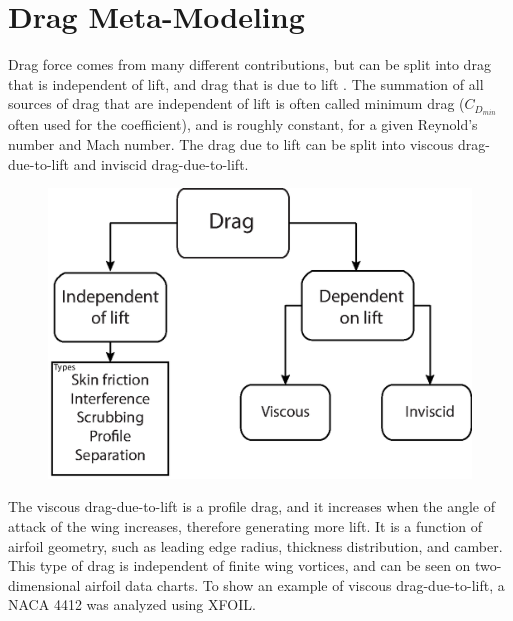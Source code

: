 \chapter{Drag Meta-Modeling}
Drag force comes from many different contributions, but can be split into drag that is independent of lift, and drag that is due to lift \cite{nicolaiWhitePaper}. The summation of all sources of drag that are  independent of lift is often called minimum drag ($C_{D_{min}}$ often used for the coefficient)\cite{raymer}, and is roughly constant, for a given Reynold's number and Mach number. The drag due to lift can be split into viscous drag-due-to-lift and inviscid drag-due-to-lift.
\begin{figure}[h!]
  \centering
  \includegraphics[width=.6\linewidth]{figures/dragDefinition.eps}
  \label{dragDefFig}
\end{figure}

 The viscous drag-due-to-lift is a profile drag, and it increases when the angle of attack of the wing increases, therefore generating more lift. It is a function of airfoil geometry, such as leading edge radius, thickness distribution, and camber. This type of drag is independent of finite wing vortices, and can be seen on two-dimensional airfoil data charts. To show an example of viscous drag-due-to-lift, a NACA 4412 was analyzed using XFOIL\cite{xfoil}.
 
